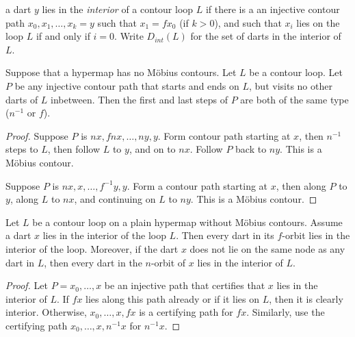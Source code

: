\begin{definition}[interior]\label{def:interior} 
a dart $y$ lies in the {\it interior} of a contour
loop $L$ if there is a an injective contour path
$x_0,x_1,\ldots,x_k=y$ such that $x_1 = f x_0$ (if $k>0$), and
such that $x_i$ lies on the loop $L$ if and only if $i=0$.
Write $D_{int}(L)$ for the set of darts in the interior of $L$.
\end{definition}

\begin{lemma}
Suppose that a hypermap has no M\"obius contours.
Let $L$ be a contour loop.  Let $P$ be any injective contour path
that starts and ends on $L$, but visits no other darts of $L$ inbetween.  
Then the first and last steps of $P$ are both of the same
type ($n^{-1}$ or $f$).
\end{lemma}

\begin{proof}  Suppose $P$ is $n x,f n x,\ldots,n y,y$.   Form
contour path starting at $x$, then $n^{-1}$ steps to $L$, then
follow $L$ to $y$, and on to $n x$.  Follow $P$ back to $n y$.  This
is a M\"obius contour.

Suppose $P$ is $n x,x,\ldots,f^{-1} y,y$.  Form a contour path
starting at $x$, then along $P$ to $y$, along $L$ to $n x$, and
continuing on $L$ to $n y$.  This is a M\"obius contour.
\end{proof}



\begin{lemma}
Let $L$ be a contour loop on a plain hypermap without
M\"obius contours.  Assume a dart $x$ lies in the interior of the loop $L$. 
Then every dart in its $f$-orbit lies in
the interior of the loop.  Moreover, if the dart
$x$ does not lie on the same node as any dart in $L$, then every
dart in the $n$-orbit of $x$ lies in the interior 
of $L$.
\end{lemma}

\begin{proof} Let $P= x_0,\ldots,x$ be an injective path that certifies that $x$ lies
in the interior of $L$.  If $f x$ lies along this path already or if it lies on $L$,
then it is clearly interior.  Otherwise, $x_0,\ldots,x,f x$ is a certifying path
for $f x$.  Similarly, use the certifying path $x_0,\ldots,x,n^{-1} x$ for $n^{-1} x$.
\end{proof}


